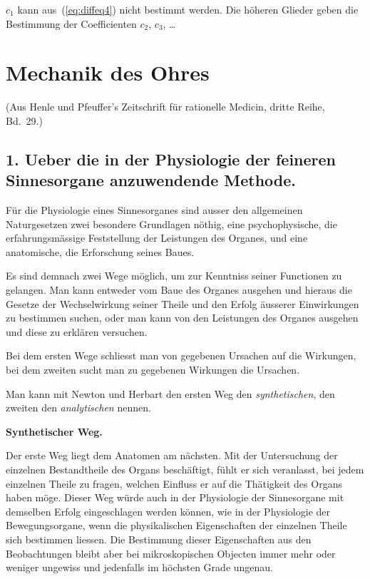 \documentclass[12pt,a4paper]{article}
\begin{document}
$c_1$ kann aus~(\ref{eq:diffeq4}) nicht bestimmt werden. Die h\"oheren Glieder geben die Bestimmung der Coefficienten $c_2$, $c_3$, \ldots

\newpage

\section{Mechanik des Ohres}

\begin{center}
\small
(Aus Henle und Pfeuffer's Zeitschrift f\"ur rationelle Medicin, dritte Reihe, Bd.~29.)
\end{center}

\subsection*{1. Ueber die in der Physiologie der feineren Sinnesorgane anzuwendende Methode.}

F\"ur die Physiologie eines Sinnesorganes sind ausser den allgemeinen Naturgesetzen zwei besondere Grundlagen n\"othig, eine psychophysische, die erfahrungsm\"assige Feststellung der Leistungen des Organes, und eine anatomische, die Erforschung seines Baues.

Es sind demnach zwei Wege m\"oglich, um zur Kenntniss seiner Functionen zu gelangen. Man kann entweder vom Baue des Organes ausgehen und hieraus die Gesetze der Wechselwirkung seiner Theile und den Erfolg \"ausserer Einwirkungen zu bestimmen suchen, oder man kann von den Leistungen des Organes ausgehen und diese zu erkl\"aren versuchen.

Bei dem ersten Wege schliesst man von gegebenen Ursachen auf die Wirkungen, bei dem zweiten sucht man zu gegebenen Wirkungen die Ursachen.

Man kann mit Newton und Herbart den ersten Weg den \emph{synthetischen}, den zweiten den \emph{analytischen} nennen.

\textbf{Synthetischer Weg.}

Der erste Weg liegt dem Anatomen am n\"achsten. Mit der Untersuchung der einzelnen Bestandtheile des Organs besch\"aftigt, f\"uhlt er sich veranlasst, bei jedem einzelnen Theile zu fragen, welchen Einfluss er auf die Th\"atigkeit des Organs haben m\"oge. Dieser Weg w\"urde auch in der Physiologie der Sinnesorgane mit demselben Erfolg eingeschlagen werden k\"onnen, wie in der Physiologie der Bewegungsorgane, wenn die physikalischen Eigenschaften der einzelnen Theile sich bestimmen liessen. Die Bestimmung dieser Eigenschaften aus den Beobachtungen bleibt aber bei mikroskopischen Objecten immer mehr oder weniger ungewiss und jedenfalls im h\"ochsten Grade ungenau.
\end{document}
